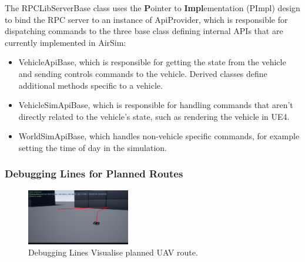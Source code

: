The RPCLibServerBase class uses the \textbf{P}ointer to \textbf{Impl}ementation (PImpl) design to bind the RPC server to an instance of ApiProvider, which is responsible for dispatching commands to the three base class defining internal APIs that are currently implemented in AirSim: 
\begin{itemize}
    \item VehicleApiBase, which is responsible for getting the state from the vehicle and sending controls commands to the vehicle. Derived classes define additional methods specific to a vehicle.
    \item VehicleSimApiBase, which is responsible for handling commands that aren't directly related to the vehicle's state, such as rendering the vehicle in UE4.
    \item WorldSimApiBase, which handles non-vehicle specific commands, for example setting the time of day in the simulation.
\end{itemize}


\subsubsection{Debugging Lines for Planned Routes}

\begin{figure}
    \centering
    \includegraphics[width=0.4\textwidth]{Chapters/SimulationEnv/Figs/DebuggingLines/DebugLines.png}
    \caption{Debugging Lines Visualise planned UAV route.}
    \label{fig:DebuggingLines}
\end{figure}

